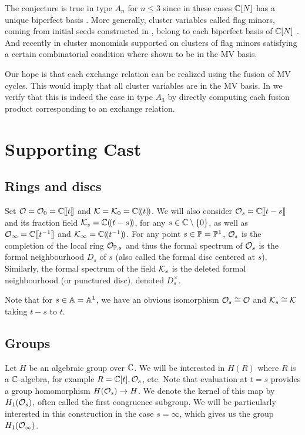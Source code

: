 \documentclass{article}
\begin{document}
The conjecture is true in type $A_n$ for $n\leq 3$ since in these cases $\CC[N]$ has a unique biperfect basis \cite[Section 2.3]{baumann2019mirkovic}.
% 
More generally, cluster variables called flag minors, coming from initial seeds constructed in \cite[Definitions~2.2--2.3]{berenstein2005cluster3}, belong to each biperfect basis of $\CC[N]$ \cite[Remark~2.10]{baumann2019mirkovic}. 
And recently in \cite[Proposition 7.2]{baumann2020bases} cluster monomials supported on clusters of flag minors satisfying a certain combinatorial condition where shown to be in the MV basis. 

Our hope is that each exchange relation can be realized using the fusion of MV cycles. This would imply that all cluster variables are in the MV basis. In  we verify that this is indeed the case in type $A_3$ by directly computing each fusion product corresponding to an exchange relation.

\section{Supporting Cast}
\label{s:players}
% 
\subsection{Rings and discs}
\label{ss:rings}
Set $\cO = \cO_0 = \CC\xt$ and $\cK = \cK_0 = \CC\xT$.
We will also consider $\cO_s = \CC\xt[t-s]$ and its fraction field $\cK_s=\CC\xT[t-s]$, for any $ s \in \CC\setminus\{0\} $, as well as $ \Oinf = \CC\xt[t^{-1}] $ and $\Kinf = \CC\xT[t^{-1}]$. For any point $ s \in \PP = \PP^1$, $ \cO_s$ is the completion of the local ring $ \mathcal O_{\PP, s} $ and thus the formal spectrum of $ \cO_s$ is the formal neighbourhood $ D_s$ of $ s $ (also called the formal disc centered at $ s$).  Similarly, the formal spectrum of the field $\cK_s$ is the deleted formal neighbourhood (or punctured disc), denoted $ D_s^\times$.

Note that for $ s \in \AA = \AA^1$, we have an obvious isomorphism  $\cO_s \cong \cO$ and $\cK_s\cong\cK$ taking $ t-s $ to $ t$. 
% 

\subsection{Groups}
\label{ss:groups}
% 
Let $H $ be an algebraic group over $ \CC $.  We will be interested in $ H(R)$ where $ R $ is a $\CC$-algebra, for example $R = \CC[t], \cO_s$, etc.  
% 
Note that evaluation at $ t = s$ provides a group homomorphism $ H(\cO_s) \rightarrow H$.  We denote the kernel of this map by $ H_1(\cO_s)$, often called the  first congruence subgroup.  We will be particularly interested in this construction in the case $ s = \infty$, which gives us the group $ H_1(\Oinf)$.
\end{document}
